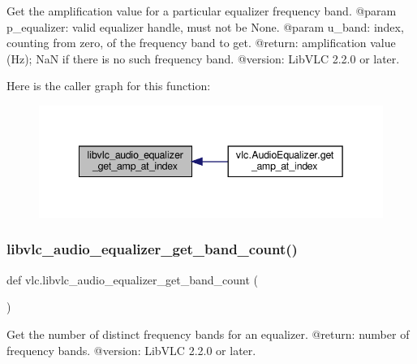 \begin{DoxyVerb}Get the amplification value for a particular equalizer frequency band.
@param p_equalizer: valid equalizer handle, must not be None.
@param u_band: index, counting from zero, of the frequency band to get.
@return: amplification value (Hz); NaN if there is no such frequency band.
@version: LibVLC 2.2.0 or later.
\end{DoxyVerb}
 Here is the caller graph for this function\+:
\nopagebreak
\begin{figure}[H]
\begin{center}
\leavevmode
\includegraphics[width=342pt]{namespacevlc_ab14a271ab740aa688682202d8957f024_icgraph}
\end{center}
\end{figure}
\mbox{\label{namespacevlc_ac28be065813cf41bff2b697298292012}} 
\subsubsection{\texorpdfstring{libvlc\+\_\+audio\+\_\+equalizer\+\_\+get\+\_\+band\+\_\+count()}{libvlc\_audio\_equalizer\_get\_band\_count()}}
{\footnotesize\ttfamily def vlc.\+libvlc\+\_\+audio\+\_\+equalizer\+\_\+get\+\_\+band\+\_\+count (\begin{DoxyParamCaption}{ }\end{DoxyParamCaption})}

\begin{DoxyVerb}Get the number of distinct frequency bands for an equalizer.
@return: number of frequency bands.
@version: LibVLC 2.2.0 or later.
\end{DoxyVerb}
 \mbox{\label{namespacevlc_a14f45eb50bd638168970304368353603}} 
